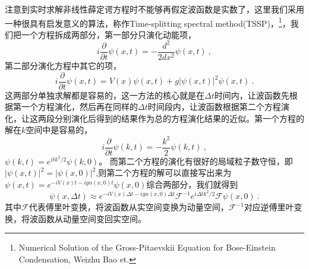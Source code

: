 注意到实时求解非线性薛定谔方程时不能够再假定波函数是实数了，这里我们采用一种很具有启发意义的算法，称作Time-splitting spectral method(TSSP)，\footnote{Numerical Solution of the Gross-Pitaevskii Equation for Bose-Einstein Condensation, Weizhu Bao et.}，我们把一个方程拆成两部分，第一部分只演化动能项，
\begin{equation}
i\frac{\partial}{\partial t} \psi(x,t) = -\frac{d^2}{2dx^2} \psi(x,t)~,
\end{equation}
第二部分演化方程中其它的项，
\begin{equation}
i\frac{\partial}{\partial t}\psi(x,t) = V(x)\psi(x,t) + g |\psi(x,t)|^2\psi(x,t) ~.
\end{equation}
这两部分单独求解都是容易的，这一方法的核心就是在$\Delta t$时间内，让波函数先根据第一个方程演化，然后再在同样的$\Delta t$时间段内，让波函数根据第二个方程演化，让这两段分别演化后得到的结果作为总的方程演化结果的近似。第一个方程的解在$k$空间中是容易的，
\begin{equation}
i\frac{\partial}{\partial t}\psi(k,t) = -\frac{k^2}{2}\psi(k,t) ~,
\end{equation}
$\psi(k,t) = e^{itk^2/2}\psi(k,0)$。 而第二个方程的演化有很好的局域粒子数守恒，即$|\psi(x,t)|^2 = |\psi(x,0)|^2$,则第二个方程的解可以直接写出来为$\psi(x,t) = e^{-iV(x)t-ig n(x,0)t}\psi(x,0)$综合两部分，我们就得到
\begin{equation}
\psi(x,\Delta t) \approx e^{-iV(x)\Delta t - ig n(x,0)\Delta t}\mathcal{F}^{-1}e^{i\Delta t k^2/2}\mathcal{F}\psi(x,0)~.
\end{equation}
其中$\mathcal{F}$代表傅里叶变换，将波函数从实空间变换为动量空间，$\mathcal{F}^{-1}$对应逆傅里叶变换，将波函数从动量空间变回实空间。